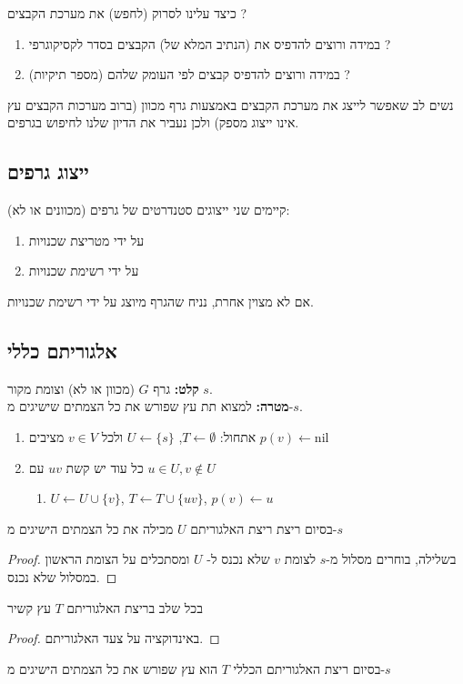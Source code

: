 כיצד עלינו לסרוק (לחפש) את מערכת הקבצים ? 
\begin{enumerate}
\item
במידה ורוצים להדפיס את (הנתיב המלא של) הקבצים בסדר לקסיקוגרפי ?
\item
במידה ורוצים להדפיס קבצים לפי העומק שלהם (מספר תיקיות) ?
\end{enumerate}
נשים לב שאפשר לייצג את מערכת הקבצים באמצעות גרף מכוון (ברוב מערכות הקבצים עץ אינו ייצוג מספק)
ולכן נעביר את הדיון שלנו לחיפוש בגרפים.

\subsection*{ייצוג גרפים}
קיימים שני ייצוגים סטנדרטים של גרפים (מכוונים או לא):
\begin{enumerate}
\item
על ידי מטריצת שכנויות
\item
על ידי רשימת שכנויות
\end{enumerate}
אם לא מצוין אחרת, נניח שהגרף מיוצג על ידי רשימת שכנויות.



\subsection*{אלגוריתם כללי}
\textbf{קלט:}
גרף $G$ (מכוון או לא) וצומת מקור $s$.
\\
\textbf{מטרה:}
למצוא תת עץ שפורש את כל הצמתים שישיגים מ-$s$.
\begin{enumerate}
\item 
אתחול:
$T \leftarrow \emptyset$, 
$U \leftarrow \{s\}$
ולכל 
$v \in V$
מציבים 
$p(v) \leftarrow \text{nil}$
\item
כל עוד יש קשת
$uv$
עם
$u \in U, v \notin U$
	\begin{enumerate}
	\item
	$U \leftarrow U \cup \{v\}$,
	$T \leftarrow T \cup \{uv\}$,
	$p(v) \leftarrow u$
	\end{enumerate}
\end{enumerate}

\begin{observation}
בסיום ריצת ריצת האלגוריתם
$U$
מכילה את כל הצמתים הישיגים מ-$s$
\end{observation}
\begin{proof}
בשלילה, בוחרים מסלול מ-$s$ לצומת $v$ שלא נכנס ל-%
$U$
ומסתכלים על הצומת הראשון במסלול שלא נכנס.
\end{proof}
\begin{observation}
בכל שלב בריצת האלגוריתם
$T$
עץ קשיר
\end{observation}
\begin{proof}
באינדוקציה על צעד האלגוריתם.
\end{proof}
\begin{theorem}
בסיום ריצת האלגוריתם הכללי $T$ הוא עץ שפורש את כל הצמתים הישיגים מ-$s$
\end{theorem}





